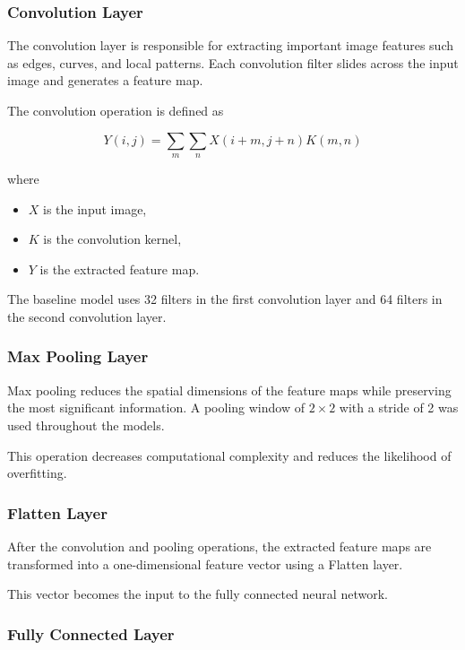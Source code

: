 \subsubsection{Convolution Layer}

The convolution layer is responsible for extracting important image features such as edges, curves, and local patterns. Each convolution filter slides across the input image and generates a feature map.

The convolution operation is defined as

\begin{equation}
Y(i,j)=\sum_{m}\sum_{n}X(i+m,j+n)K(m,n)
\end{equation}

where

\begin{itemize}
    \item $X$ is the input image,
    \item $K$ is the convolution kernel,
    \item $Y$ is the extracted feature map.
\end{itemize}

The baseline model uses 32 filters in the first convolution layer and 64 filters in the second convolution layer.

\subsubsection{Max Pooling Layer}

Max pooling reduces the spatial dimensions of the feature maps while preserving the most significant information. A pooling window of $2\times2$ with a stride of 2 was used throughout the models.

This operation decreases computational complexity and reduces the likelihood of overfitting.

\subsubsection{Flatten Layer}

After the convolution and pooling operations, the extracted feature maps are transformed into a one-dimensional feature vector using a Flatten layer.

This vector becomes the input to the fully connected neural network.

\subsubsection{Fully Connected Layer}

